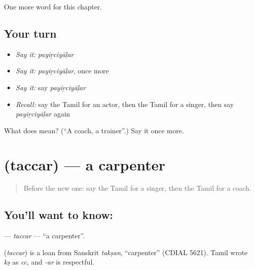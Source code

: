 \begin{grammarlens}[title={What you've built}]
One more word for this chapter.
\end{grammarlens}

\subsection*{Your turn}
\begin{itemize}
\raggedright
  \item \emph{Say it:} \emph{payiṟciyāḷar}
  \item \emph{Say it:} \emph{payiṟciyāḷar}, once more
  \item \emph{Say it:} say \emph{payiṟciyāḷar}
  \item \emph{Recall:} say the Tamil for an actor, then the Tamil for a singer, then say \emph{payiṟciyāḷar} again
\end{itemize}

\begin{tcolorbox}[breakable,colback=teal!4,colframe=teal!35!black,title={Before you move on}]
What does  mean? (\textquotedblleft{}A coach, a trainer\textquotedblright{}.) Say it once more.
\end{tcolorbox}
\section[\texorpdfstring{\ta{தச்சர்} (taccar)}{தச்சர் (taccar)}]{ (taccar) — a carpenter}

\label{lesson:TA-C193-taccar}



\begin{quote}
Before the new one: say the Tamil for a singer, then the Tamil for a coach.
\end{quote}

\subsection*{You'll want to know: }
\textbf{} — \emph{taccar} — \textquotedblleft{}a carpenter\textquotedblright{}.

\begin{cousinweb}
\textbf{} (\emph{taccar}) is a loan from Sanskrit \emph{takṣan}, \textquotedblleft{}carpenter\textquotedblright{} (CDIAL 5621). Tamil wrote \emph{kṣ} as \emph{cc}, and \emph{-ar} is respectful.
\end{cousinweb}

